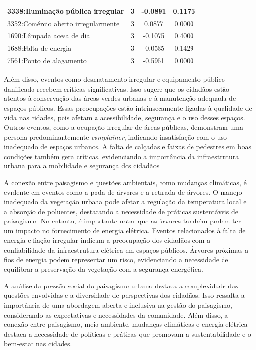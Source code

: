\begin{table}[htbp]
\begin{tabular}{|l|c|c|c|c|}
		\hline
		3338:Iluminação pública irregular       & 3                & -0.0891        & 0.1176           \\
		\hline
		3352:Comércio aberto irregularmente     & 3                & 0.0877         & 0.0000           \\
		\hline
		1690:Lâmpada acesa de dia               & 3                & -0.1075        & 0.4000           \\
		\hline
		1688:Falta de energia                   & 3                & -0.0585        & 0.1429           \\
		\hline
		7561:Ponto de alagamento                & 3                & -0.5951        & 0.0000           \\
		\hline
	\end{tabular}
\end{table}

Além disso, eventos como desmatamento irregular e equipamento público danificado recebem críticas significativas. Isso sugere que os cidadãos estão atentos à conservação das áreas verdes urbanas e à manutenção adequada de espaços públicos. Essas preocupações estão intrinsecamente ligadas à qualidade de vida nas cidades, pois afetam a acessibilidade, segurança e o uso desses espaços. Outros eventos, como a ocupação irregular de áreas públicas, demonstram uma persona predominantemente \textit{complainer}, indicando insatisfação com o uso inadequado de espaços urbanos. A falta de calçadas e faixas de pedestres em boas condições também gera críticas, evidenciando a importância da infraestrutura urbana para a mobilidade e segurança dos cidadãos.

A conexão entre paisagismo e questões ambientais, como mudanças climáticas, é evidente em eventos como a poda de árvores e a retirada de árvores. O manejo inadequado da vegetação urbana pode afetar a regulação da temperatura local e a absorção de poluentes, destacando a necessidade de práticas sustentáveis de paisagismo. No entanto, é importante notar que as árvores também podem ter um impacto no fornecimento de energia elétrica. Eventos relacionados à falta de energia e fiação irregular indicam a preocupação dos cidadãos com a confiabilidade da infraestrutura elétrica em espaços públicos. Árvores próximas a fios de energia podem representar um risco, evidenciando a necessidade de equilibrar a preservação da vegetação com a segurança energética.

A análise da pressão social do paisagismo urbano destaca a complexidade das questões envolvidas e a diversidade de perspectivas dos cidadãos. Isso ressalta a importância de uma abordagem aberta e inclusiva na gestão do paisagismo, considerando as expectativas e necessidades da comunidade. Além disso, a conexão entre paisagismo, meio ambiente, mudanças climáticas e energia elétrica destaca a necessidade de políticas e práticas que promovam a sustentabilidade e o bem-estar nas cidades.


